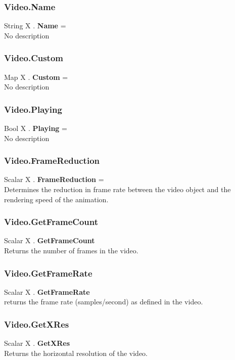 \documentclass[10pt]{book}
\begin{document}
\subsubsection{Video.Name \label{F:Video:Name}}
String X . \textbf{Name} = \\
No description

\subsubsection{Video.Custom \label{F:Video:Custom}}
Map X . \textbf{Custom} = \\
No description

\subsubsection{Video.Playing \label{F:Video:Playing}}
Bool X . \textbf{Playing} = \\
No description

\subsubsection{Video.FrameReduction \label{F:Video:FrameReduction}}
Scalar X . \textbf{FrameReduction} = \\
Determines the reduction in frame rate between the video object and the rendering speed of the animation.

\subsubsection{Video.GetFrameCount \label{F:Video:GetFrameCount}}
Scalar X . \textbf{GetFrameCount} \\
Returns the number of frames in the video.

\subsubsection{Video.GetFrameRate \label{F:Video:GetFrameRate}}
Scalar X . \textbf{GetFrameRate} \\
returns the frame rate (samples/second) as defined in the video.

\subsubsection{Video.GetXRes \label{F:Video:GetXRes}}
Scalar X . \textbf{GetXRes} \\
Returns the horizontal resolution of the video.
\end{document}
